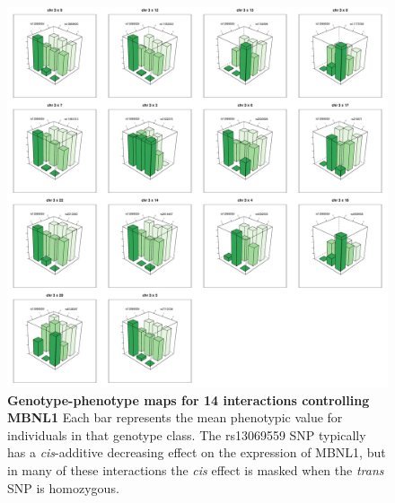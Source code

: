 \documentclass{article}
\begin{document}
\begin{figure}
	\centering
	\includegraphics[width=5in]{MBNL1}
	\caption{\textbf{Genotype-phenotype maps for 14 interactions controlling MBNL1} Each bar represents the mean phenotypic value for individuals in that genotype class. The rs13069559 SNP typically has a \emph{cis}-additive decreasing effect on the expression of MBNL1, but in many of these interactions the \emph{cis} effect is masked when the \emph{trans} SNP is homozygous.}
	\label{fig:mbnl13d}
\end{figure}
\clearpage
\end{document}
